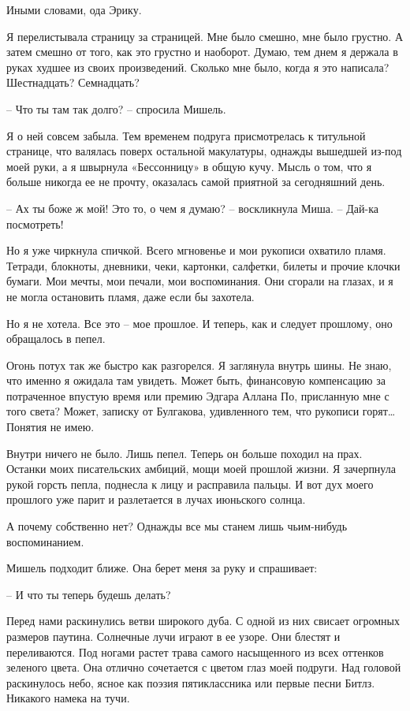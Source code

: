 \documentclass[
]{book}
\begin{document}
Иными словами, ода Эрику.

Я перелистывала страницу за страницей. Мне было смешно, мне было грустно. А затем смешно от того, как это грустно и наоборот. Думаю, тем днем я держала в руках худшее из своих произведений. Сколько мне было, когда я это написала? Шестнадцать? Семнадцать?

-- Что ты там так долго? -- спросила Мишель.

Я о ней совсем забыла. Тем временем подруга присмотрелась к титульной странице, что валялась поверх остальной макулатуры, однажды вышедшей из-под моей руки, а я швырнула «Бессонницу» в общую кучу. Мысль о том, что я больше никогда ее не прочту, оказалась самой приятной за сегодняшний день.

-- Ах ты боже ж мой! Это то, о чем я думаю? -- воскликнула Миша. -- Дай-ка посмотреть!

Но я уже чиркнула спичкой. Всего мгновенье и мои рукописи охватило пламя. Тетради, блокноты, дневники, чеки, картонки, салфетки, билеты и прочие клочки бумаги. Мои мечты, мои печали, мои воспоминания. Они сгорали на глазах, и я не могла остановить пламя, даже если бы захотела.

Но я не хотела. Все это -- мое прошлое. И теперь, как и следует прошлому, оно обращалось в пепел.

Огонь потух так же быстро как разгорелся. Я заглянула внутрь шины. Не знаю, что именно я ожидала там увидеть. Может быть, финансовую компенсацию за потраченное впустую время или премию Эдгара Аллана По, присланную мне с того света? Может, записку от Булгакова, удивленного тем, что рукописи горят\ldots{} Понятия не имею.

Внутри ничего не было. Лишь пепел. Теперь он больше походил на прах. Останки моих писательских амбиций, мощи моей прошлой жизни. Я зачерпнула рукой горсть пепла, поднесла к лицу и расправила пальцы. И вот дух моего прошлого уже парит и разлетается в лучах июньского солнца.

А почему собственно нет? Однажды все мы станем лишь чьим-нибудь воспоминанием.

Мишель подходит ближе. Она берет меня за руку и спрашивает:

-- И что ты теперь будешь делать?

Перед нами раскинулись ветви широкого дуба. С одной из них свисает огромных размеров паутина. Солнечные лучи играют в ее узоре. Они блестят и переливаются. Под ногами растет трава самого насыщенного из всех оттенков зеленого цвета. Она отлично сочетается с цветом глаз моей подруги. Над головой раскинулось небо, ясное как поэзия пятиклассника или первые песни Битлз. Никакого намека на тучи.
\end{document}
